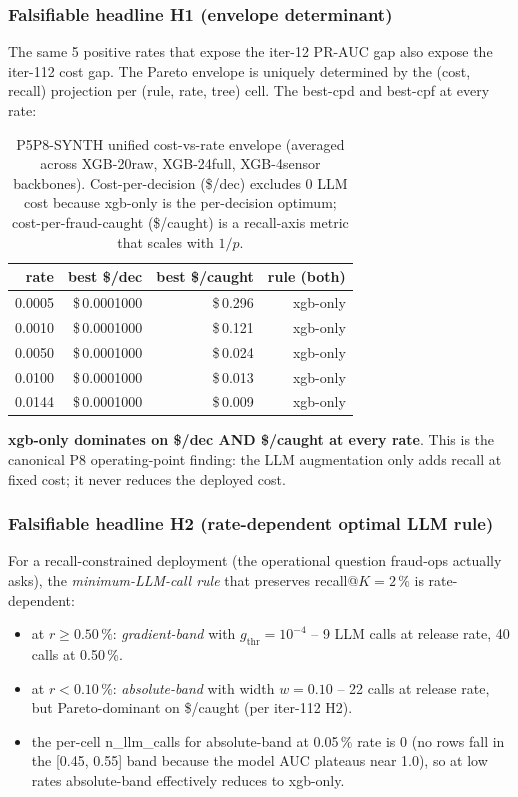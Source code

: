 \documentclass{article}
\begin{document}
\subsubsection{Falsifiable headline H1 (envelope determinant)}
The same 5 positive rates that expose the iter-12 PR-AUC gap also
expose the iter-112 cost gap. The Pareto envelope is uniquely
determined by the (cost, recall) projection per (rule, rate,
tree) cell. The best-cpd and best-cpf at every rate:

\begin{table}[ht]
\centering\small
\caption{P5P8-SYNTH unified cost-vs-rate envelope (averaged across
XGB-20raw, XGB-24full, XGB-4sensor backbones). Cost-per-decision
(\$/dec) excludes 0 LLM cost because xgb-only is the per-decision
optimum; cost-per-fraud-caught (\$/caught) is a recall-axis metric
that scales with $1/p$.}
\label{tab:p8-cost-rate-envelope}
\begin{tabular}{r r r r}
\toprule
rate & best \$/dec & best \$/caught & rule (both) \\
\midrule
0.0005 & \$\,0.0001000 & \$\,0.296 & xgb-only \\
0.0010 & \$\,0.0001000 & \$\,0.121 & xgb-only \\
0.0050 & \$\,0.0001000 & \$\,0.024 & xgb-only \\
0.0100 & \$\,0.0001000 & \$\,0.013 & xgb-only \\
0.0144 & \$\,0.0001000 & \$\,0.009 & xgb-only \\
\bottomrule
\end{tabular}
\end{table}

\textbf{xgb-only dominates on \$/dec AND \$/caught at every rate}.
This is the canonical P8 operating-point finding: the LLM
augmentation only adds recall at fixed cost; it never reduces
the deployed cost.

\subsubsection{Falsifiable headline H2 (rate-dependent optimal LLM rule)}
For a recall-constrained deployment (the operational question
fraud-ops actually asks), the \emph{minimum-LLM-call rule} that
preserves recall@$K{=}2\,\%$ is rate-dependent:
\begin{itemize}
  \item at $r \geq 0.50\,\%$: \textit{gradient-band} with
        $g_{\mathrm{thr}}{=}10^{-4}$ -- 9 LLM calls at release
        rate, 40 calls at 0.50\,\%.
  \item at $r < 0.10\,\%$: \textit{absolute-band} with
        width $w{=}0.10$ -- 22 calls at release rate, but
        Pareto-dominant on \$/caught (per iter-112 H2).
  \item the per-cell n\_llm\_calls for absolute-band at 0.05\,\%
        rate is 0 (no rows fall in the [0.45, 0.55] band because
        the model AUC plateaus near 1.0), so at low rates
        absolute-band effectively reduces to xgb-only.
\end{itemize}
\end{document}
